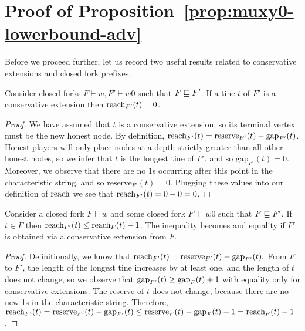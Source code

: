 \section{Proof of Proposition~\ref{prop:muxy0-lowerbound-adv}}
  Before we proceed further, let us record two useful results related to conservative extensions 
  and closed fork prefixes. 

  \begin{claim}\label{claim:ex}
    Consider closed forks $F\vdash w, F'\vdash w0$ 
    such that $F\sqsubseteq F'$. 
    If a tine $t$ of $F'$ is a conservative extension 
    then $\operatorname{reach}_{F'}(t)=0$.
  \end{claim}
  \begin{proof}
    We have assumed that $t$ is a conservative extension, 
    so its terminal vertex must be the new honest node. 
    By definition, 
    $\operatorname{reach}_{F'}(t)=\text{reserve}_{F'}(t)-\text{gap}_{F'}(t)$. 
    Honest players will only place nodes 
    at a depth strictly greater than all other honest nodes, 
    so we infer that $t$ is the longest tine of $F'$, 
    and so $\text{gap}_{F'}(t)=0$. 
    Moreover, we observe that 
    there are no 1s occurring after this point 
    in the characteristic string, 
    and so $\text{reserve}_{F'}(t)=0$. 
    Plugging these values into 
    our definition of $\operatorname{reach}$ 
    we see that $\operatorname{reach}_{F'}(t)=0-0=0$. 
  \end{proof}


  \begin{claim}\label{claim:nex}
    Consider a closed fork $F\vdash w$ and some closed fork $F'\vdash w0$ such that $F\sqsubseteq F'$. If $t \in F$ then 
    $\operatorname{reach}_{F'}(t)\leq \operatorname{reach}_{F}(t) - 1$. 
    The inequality becomes and equality 
    if $F'$ is obtained via a conservative extension from $F$.
  \end{claim}
  \begin{proof}
    Definitionally, we know that $\operatorname{reach}_{F'}(t)=\text{reserve}_{F'}(t)-\text{gap}_{F'}(t).$ From $F$ to $F'$, the length of the longest tine increases by at least one, and the length of $t$ does not change, so we observe that $\operatorname{gap}_{F'}(t) \geq \operatorname{gap}_{F}(t) + 1$ 
    with equality only for conservative extensions. 
    The reserve of $t$ does not change, because there are no new 1s in the characteristic string. Therefore, 
    $
      \operatorname{reach}_{F'}(t)
      =\text{reserve}_{F'}(t)-\text{gap}_{F'}(t)
      \leq \text{reserve}_{F}(t)-\text{gap}_{F}(t) - 1
      =\operatorname{reach}_{F}(t) - 1
    $. 
  \end{proof}


